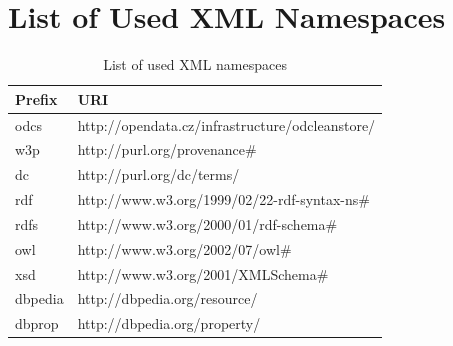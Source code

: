 \chapter{List of Used XML Namespaces}

\begin{table}[h!]
\centering
\begin{tabular}{|l|l|}
	\hline
	\ttfamily
	\textrm{\textbf{Prefix}} & \textrm{\textbf{URI}} \\
	\hline\hline
	odcs & http://opendata.cz/infrastructure/odcleanstore/ \\
	\hline
	w3p & http://purl.org/provenance\# \\
	\hline
	dc & http://purl.org/dc/terms/ \\
	\hline
	rdf & http://www.w3.org/1999/02/22-rdf-syntax-ns\# \\
	\hline
	rdfs & http://www.w3.org/2000/01/rdf-schema\# \\
	\hline
	owl & http://www.w3.org/2002/07/owl\# \\
	\hline
	xsd & http://www.w3.org/2001/XMLSchema\# \\
	\hline
	dbpedia & http://dbpedia.org/resource/ \\
	\hline
	dbprop & http://dbpedia.org/property/ \\
	\hline
\end{tabular}
\caption{List of used XML namespaces}
\end{table} 


